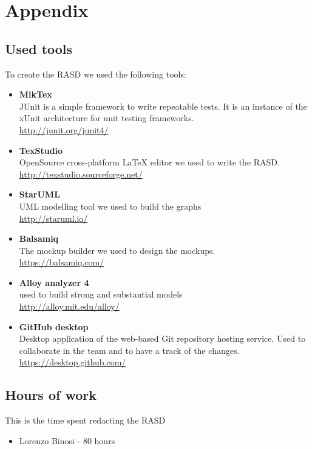 \section{Appendix}
\subsection{Used tools}
To create the RASD we used the following tools:
\begin{itemize}
	\item \textbf{MikTex} \\ JUnit is a simple framework to write repeatable tests. It is an instance of the xUnit architecture for unit testing frameworks.
 \\ \url{http://junit.org/junit4/} 
	\item \textbf{TexStudio}\\ OpenSource cross-platform LaTeX editor we used to write the RASD. \\ \url{http://texstudio.sourceforge.net/} 
	\item \textbf{StarUML}\\ UML modelling tool we used to build the graphs\\ \url{http://staruml.io/} 
	\item \textbf{Balsamiq}\\ The mockup builder we used to design the mockups. \\ \url{https://balsamiq.com/} 
	\item \textbf{Alloy analyzer 4}\\ used to build  strong and substantial models \\ \url{ http://alloy.mit.edu/alloy/}
	\item \textbf{GitHub desktop}\\ Desktop application of the web-based Git repository hosting service. Used to collaborate in the team and to have a track of the changes.  \\ \url{https://desktop.github.com/} 
\end{itemize}


\subsection{Hours of work}
This is the time spent redacting the RASD
\begin{itemize}
	\item {Lorenzo Binosi} - 80 hours
\end{itemize}

